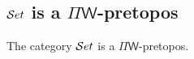 \documentclass[hott-all.tex]{subfiles}
\begin{document}
\subsection{\texorpdfstring{$\mathcal{S}et$}{Set} is a \texorpdfstring{$\Pi\mathsf{W}$}{ΠW}-pretopos}
% 
% 
% 
% 
\begin{thm}
  The category $\mathcal{S}et$ is a $\Pi\mathsf{W}$-pretopos.
\end{thm}
\end{document}
